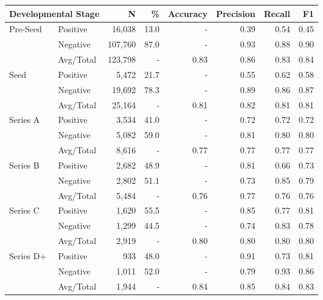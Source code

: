 \begin{tabular}{llrrrrrr} \toprule
\multicolumn{2}{l}{Developmental Stage}
                  & N       & \%   & Accuracy  & Precision  & Recall  & F1   \\ \midrule
Pre-Seed    & Positive & 16,038  & 13.0 & -    & 0.39 & 0.54 & 0.45 \\
            & Negative & 107,760 & 87.0 & -    & 0.93 & 0.88 & 0.90 \\
            & Avg/Total & 123,798 & -    & 0.83 & 0.86 & 0.83 & 0.84 \\ \midrule
Seed        & Positive & 5,472   & 21.7 & -    & 0.55 & 0.62 & 0.58 \\
            & Negative & 19,692  & 78.3 & -    & 0.89 & 0.86 & 0.87 \\
            & Avg/Total & 25,164  & -    & 0.81 & 0.82 & 0.81 & 0.81 \\ \midrule
Series A    & Positive & 3,534   & 41.0 & -    & 0.72 & 0.72 & 0.72 \\
            & Negative & 5,082   & 59.0 & -    & 0.81 & 0.80 & 0.80 \\
            & Avg/Total & 8,616   & -    & 0.77 & 0.77 & 0.77 & 0.77 \\ \midrule
Series B    & Positive & 2,682   & 48.9 & -    & 0.81 & 0.66 & 0.73 \\
            & Negative & 2,802   & 51.1 & -    & 0.73 & 0.85 & 0.79 \\
            & Avg/Total & 5,484   & -    & 0.76 & 0.77 & 0.76 & 0.76 \\ \midrule
Series C    & Positive & 1,620   & 55.5 & -    & 0.85 & 0.77 & 0.81 \\
            & Negative & 1,299   & 44.5 & -    & 0.74 & 0.83 & 0.78 \\
            & Avg/Total & 2,919   & -    & 0.80 & 0.80 & 0.80 & 0.80 \\ \midrule
Series D+   & Positive & 933     & 48.0 & -    & 0.91 & 0.73 & 0.81 \\
            & Negative & 1,011   & 52.0 & -    & 0.79 & 0.93 & 0.86 \\
            & Avg/Total & 1,944   & -    & 0.84 & 0.85 & 0.84 & 0.83 \\
\bottomrule \end{tabular}

